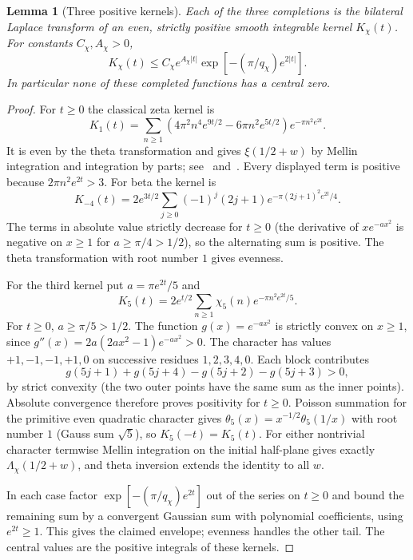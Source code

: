 \documentclass[11pt]{article}
\newtheorem{lemma}[theorem]{Lemma}
\theoremstyle{remark}\newtheorem{remark}[theorem]{Remark}
\begin{document}
\begin{lemma}[Three positive kernels]\label{lem:kernels}
Each of the three completions is the bilateral Laplace transform of an even, strictly positive smooth integrable kernel $K_\chi(t)$. For constants $C_\chi,A_\chi>0$,
\[
 K_\chi(t)\le C_\chi e^{A_\chi|t|}\exp[-(\pi/q_\chi)e^{2|t|}].
\]
In particular none of these completed functions has a central zero.
\end{lemma}
\begin{proof}
For $t\ge0$ the classical zeta kernel is
\[
 K_1(t)=\sum_{n\ge1}(4\pi^2n^4e^{9t/2}-6\pi n^2e^{5t/2})e^{-\pi n^2e^{2t}}.
\]
It is even by the theta transformation and gives $\xi(1/2+w)$ by Mellin integration and integration by parts; see~\cite[\S2.16]{titchmarsh} and~\cite[\texttt{fil:lem:kernels}]{proveit}. Every displayed term is positive because $2\pi n^2 e^{2t}>3$. For beta the kernel is
\[
 K_{-4}(t)=2e^{3t/2}\sum_{j\ge0}(-1)^j(2j+1)e^{-\pi(2j+1)^2 e^{2t}/4}.
\]
The terms in absolute value strictly decrease for $t\ge0$ (the derivative of $x e^{-a x^2}$ is negative on $x\ge1$ for $a\ge\pi/4>1/2$), so the alternating sum is positive. The theta transformation with root number $1$ gives evenness.

For the third kernel put $a=\pi e^{2t}/5$ and
\[
 K_5(t)=2e^{t/2}\sum_{n\ge1}\chi_5(n)e^{-\pi n^2e^{2t}/5}.
\]
For $t\ge0$, $a\ge\pi/5>1/2$. The function $g(x)=e^{-a x^2}$ is strictly convex on $x\ge1$, since $g''(x)=2a(2ax^2-1)e^{-ax^2}>0$. The character has values $+1,-1,-1,+1,0$ on successive residues $1,2,3,4,0$. Each block contributes
\[
 g(5j+1)+g(5j+4)-g(5j+2)-g(5j+3)>0,
\]
by strict convexity (the two outer points have the same sum as the inner points). Absolute convergence therefore proves positivity for $t\ge0$. Poisson summation for the primitive even quadratic character gives $\theta_5(x)=x^{-1/2}\theta_5(1/x)$ with root number $1$ (Gauss sum $\sqrt5$), so $K_5(-t)=K_5(t)$. For either nontrivial character termwise Mellin integration on the initial half-plane gives exactly $\Lambda_\chi(1/2+w)$, and theta inversion extends the identity to all $w$.

In each case factor $\exp[-(\pi/q_\chi)e^{2t}]$ out of the series on $t\ge0$ and bound the remaining sum by a convergent Gaussian sum with polynomial coefficients, using $e^{2t}\ge1$. This gives the claimed envelope; evenness handles the other tail. The central values are the positive integrals of these kernels.
\end{proof}
\end{document}
